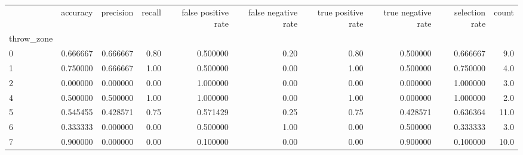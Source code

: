 \begin{tabular}{lrrrrrrrrr}
\toprule
{} &  accuracy &  precision &  recall &  false positive rate &  false negative rate &  true positive rate &  true negative rate &  selection rate &  count \\
throw\_zone &           &            &         &                      &                      &                     &                     &                 &        \\
\midrule
0          &  0.666667 &   0.666667 &    0.80 &             0.500000 &                 0.20 &                0.80 &            0.500000 &        0.666667 &    9.0 \\
1          &  0.750000 &   0.666667 &    1.00 &             0.500000 &                 0.00 &                1.00 &            0.500000 &        0.750000 &    4.0 \\
2          &  0.000000 &   0.000000 &    0.00 &             1.000000 &                 0.00 &                0.00 &            0.000000 &        1.000000 &    3.0 \\
4          &  0.500000 &   0.500000 &    1.00 &             1.000000 &                 0.00 &                1.00 &            0.000000 &        1.000000 &    2.0 \\
5          &  0.545455 &   0.428571 &    0.75 &             0.571429 &                 0.25 &                0.75 &            0.428571 &        0.636364 &   11.0 \\
6          &  0.333333 &   0.000000 &    0.00 &             0.500000 &                 1.00 &                0.00 &            0.500000 &        0.333333 &    3.0 \\
7          &  0.900000 &   0.000000 &    0.00 &             0.100000 &                 0.00 &                0.00 &            0.900000 &        0.100000 &   10.0 \\
\bottomrule
\end{tabular}
